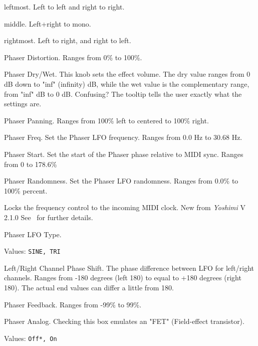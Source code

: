       \begin{enumber}
         \item leftmost. Left to left and right to right.
         \item middle. Left+right to mono.
         \item rightmost. Left to right, and right to left.
      \end{enumber}

   Phaser Distortion.
   Ranges from 0\% to 100\%.

   Phaser Dry/Wet.
   This knob sets the effect volume.  The dry value ranges from 0 dB down to
   "inf" (infinity) dB, while the wet value is the complementary range, from
   "inf" dB to 0 dB.  Confusing?  The tooltip tells the user exactly what the
   settings are.

   Phaser Panning.
   Ranges from 100\% left to centered to 100\% right.

   Phaser Freq.
   Set the Phaser LFO frequency.
   Ranges from 0.0 Hz to 30.68 Hz.

   Phaser Start.
   Set the start of the Phaser phase relative to MIDI sync.
   Ranges from 0 to 178.6\%

   Phaser Randomness.
   Set the Phaser LFO randomness.
   Ranges from 0.0\% to 100\% percent.

   Locks the frequency control to the incoming MIDI clock. New from
   \textsl{Yoshimi} V 2.1.0 See
   \ for further details.

   Phaser LFO Type.

   Values: \texttt{SINE, TRI}

   Left/Right Channel Phase Shift.
   The phase difference between LFO for left/right channels.
   Ranges from -180 degrees (left 180) to equal to +180 degrees (right 180).
   The actual end values can differ a little from 180.

   Phaser Feedback.
   Ranges from -99\% to 99\%.

   Phaser Analog.
   Checking this box emulates an "FET"  (Field-effect transistor).

   Values: \texttt{Off*, On}

